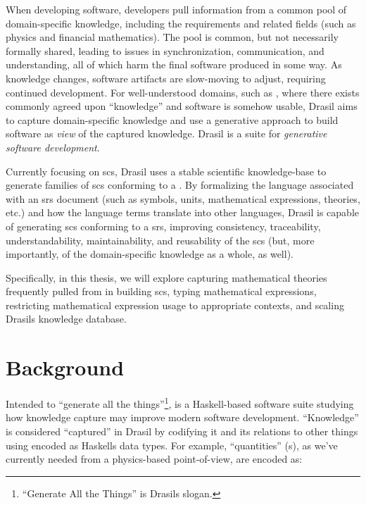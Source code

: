 When developing software, developers pull information from a common pool of
domain-specific knowledge, including the requirements and related fields (such
as physics and financial mathematics). The pool is common, but not necessarily
formally shared, leading to issues in synchronization, communication, and
understanding, all of which harm the final software produced in some way. As
knowledge changes, software artifacts are slow-moving to adjust, requiring
continued development. For well-understood domains, such as , where
there exists commonly agreed upon ``knowledge'' and software is somehow usable,
Drasil aims to capture domain-specific knowledge and use a generative approach
to build software as \textit{view} of the captured knowledge. Drasil is a suite
for \textit{generative software development}.

Currently focusing on \acs{scs}, Drasil uses a stable scientific knowledge-base
to generate families of \acs{scs} conforming to a 
\cite{SmithAndLai2005}. By formalizing the language associated with an \acf{srs}
document (such as symbols, units, mathematical expressions, theories, etc.) and
how the language terms translate into other languages, Drasil is capable of
generating \acs{scs} conforming to a \acf{srs}, improving consistency,
traceability, understandability, maintainability, and reusability of the
\acf{scs} (but, more importantly, of the domain-specific knowledge as a whole,
as well).

Specifically, in this thesis, we will explore capturing mathematical theories
frequently pulled from in building \acs{scs}, typing mathematical expressions,
restricting mathematical expression usage to appropriate contexts, and scaling
Drasils knowledge database.

\section{Background}
\label{sec:intro:background}

Intended to ``generate all the things''\footnote{``Generate All the Things'' is
      Drasils slogan.},
 is a
Haskell-based \cite{Haskell2010} software suite studying how knowledge
capture may improve modern software development. ``Knowledge'' is
considered ``captured'' in Drasil by codifying it and its relations to
other things using  encoded as Haskells data types. For example,
``quantities'' (\QuantityDict{}s), as we've currently needed from a
physics-based point-of-view, are encoded as:

